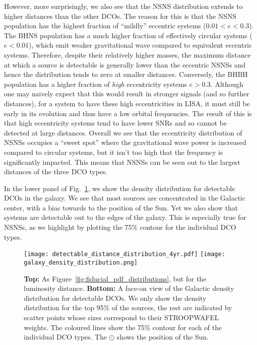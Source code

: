 However, more surprisingly, we also see that the NSNS distribution extends to higher distances than the other DCOs. The reason for this is that the NSNS population has the highest fraction of ``mildly'' eccentric systems ($0.01 < e < 0.3$). The BHNS population has a much higher fraction of effectively circular systems ($e < 0.01$), which emit weaker gravitational wave compared to equivalent eccentric systems. Therefore, despite their relatively higher masses, the maximum distance at which a source is detectable is generally lower than the eccentric NSNSs and hence the distribution tends to zero at smaller distances. Conversely, the BHBH population has a higher fraction of \textit{high} eccentricity systems $e > 0.3$. Although one may naively expect that this would result in stronger signals (and so further distances), for a system to have these high eccentricities in LISA, it must still be early in its evolution and thus have a low orbital frequencies. The result of this is that high eccentricity systems tend to have lower SNRs and so cannot be detected at large distances. Overall we see that the eccentricity distribution of NSNSs occupies a ``sweet spot'' where the gravitational wave power is increased compared to circular systems, but it isn't too high that the frequency is significantly impacted. This means that NSNSs can be seen out to the largest distances of the three DCO types.

In the lower panel of Fig.~\ref{fig:detectable_distance_dist}, we show the density distribution for detectable DCOs in the galaxy. We see that most sources are concentrated in the Galactic center, with a bias towards to the position of the Sun. Yet we also show that systems are detectable out to the edges of the galaxy. This is especially true for NSNSs, as we highlight by plotting the 75\% contour for the individual DCO types.

\begin{figure}[thb]
    \centering
    \texttt{[image: detectable\_distance\_distribution\_4yr.pdf]}
    \texttt{[image: galaxy\_density\_distribution.png]}
    \caption{\textbf{Top:} As Figure~\ref{fig:fiducial_pdf_distributions}, but for the luminosity distance. \textbf{Bottom:} A face-on view of the Galactic density distribution for detectable DCOs. We only show the density distribution for the top 95\% of the sources, the rest are indicated by scatter points whose sizes correspond to their STROOPWAFEL weights. The coloured lines show the 75\% contour for each of the individual DCO types. The $\odot$ shows the position of the Sun.}
    \label{fig:detectable_distance_dist}
\end{figure}

